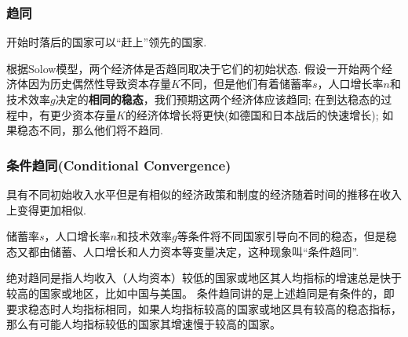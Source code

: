 \documentclass[UTF8, onecolumn, a4paper, 12pt]{article}
\begin{document}
\subsubsection{趋同}
开始时落后的国家可以“赶上”领先的国家.

根据Solow模型，两个经济体是否趋同取决于它们的初始状态. 假设一开始两个经济体因为历史偶然性导致资本存量$K$不同，但是他们有着储蓄率$s$，人口增长率$n$和技术效率$g$决定的\textbf{相同的稳态}，我们预期这两个经济体应该趋同; 在到达稳态的过程中，有更少资本存量$K$的经济体增长将更快(如德国和日本战后的快速增长); 如果稳态不同，那么他们将不趋同.

\subsubsection{条件趋同(Conditional Convergence)}
具有不同初始收入水平但是有相似的经济政策和制度的经济随着时间的推移在收入上变得更加相似. 

储蓄率$s$，人口增长率$n$和技术效率$g$等条件将不同国家引导向不同的稳态，但是稳态又都由储蓄、人口增长和人力资本等变量决定，这种现象叫“条件趋同”.


绝对趋同是指人均收入（人均资本）较低的国家或地区其人均指标的增速总是快于较高的国家或地区，比如中国与美国。 条件趋同讲的是上述趋同是有条件的，即要求稳态时人均指标相同，如果人均指标较高的国家或地区具有较高的稳态指标，那么有可能人均指标较低的国家其增速慢于较高的国家。 
\end{document}
